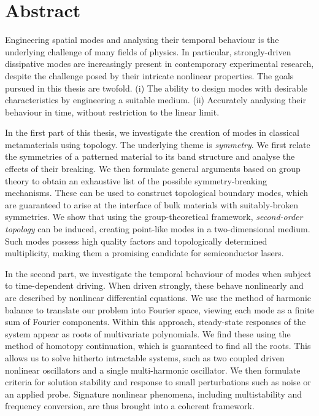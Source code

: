 
\chapter*{Abstract}

Engineering spatial modes and analysing their temporal behaviour is the underlying challenge of many fields of physics. In particular, strongly-driven dissipative modes are increasingly present in contemporary experimental research, despite the challenge posed by their intricate nonlinear properties. The goals pursued in this thesis are twofold. (i) The ability to design modes with desirable characteristics by engineering a suitable medium. (ii) Accurately analysing their behaviour in time, without restriction to the linear limit.

In the first part of this thesis, we investigate the creation of modes in classical metamaterials using topology. The underlying theme is \textit{symmetry}. We first relate the symmetries of a patterned material to its band structure and analyse the effects of their breaking. We then formulate general arguments based on group theory to obtain an exhaustive list of the possible symmetry-breaking mechanisms. These can be used to construct topological boundary modes, which are guaranteed to arise at the interface of bulk materials with suitably-broken symmetries. We show that using the group-theoretical framework, \textit{second-order topology} can be induced, creating point-like modes in a two-dimensional medium. Such modes possess high quality factors and topologically determined multiplicity, making them a promising candidate for semiconductor lasers.

In the second part, we investigate the temporal behaviour of modes when subject to time-dependent driving. When driven strongly, these behave nonlinearly and are described by nonlinear differential equations. We use the method of harmonic balance to translate our problem into Fourier space, viewing each mode as a finite sum of Fourier components. Within this approach, steady-state responses of the system appear as roots of multivariate polynomials. We find these using the method of homotopy continuation, which is guaranteed to find all the roots. This allows us to solve hitherto intractable systems, such as two coupled driven nonlinear oscillators and a single multi-harmonic oscillator. We then formulate criteria for solution stability and response to small perturbations such as noise or an applied probe. Signature nonlinear phenomena, including multistability and frequency conversion, are thus brought into a coherent framework.

